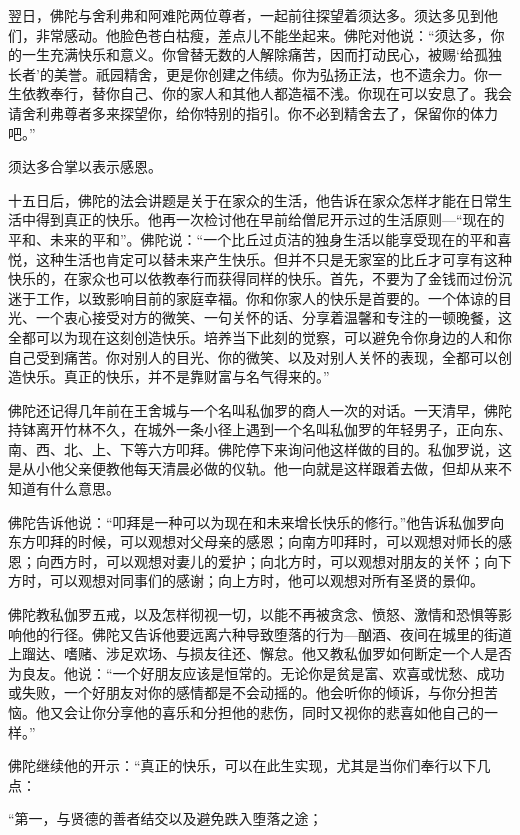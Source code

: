 \documentclass[12pt,twoside,openany]{book}
\begin{document}
翌日，佛陀与舍利弗和阿难陀两位尊者，一起前往探望着须达多。须达多见到他们，非常感动。他脸色苍白枯瘦，差点儿不能坐起来。佛陀对他说：“须达多，你的一生充满快乐和意义。你曾替无数的人解除痛苦，因而打动民心，被赐‘给孤独长者’的美誉。祇园精舍，更是你创建之伟绩。你为弘扬正法，也不遗余力。你一生依教奉行，替你自己、你的家人和其他人都造福不浅。你现在可以安息了。我会请舍利弗尊者多来探望你，给你特别的指引。你不必到精舍去了，保留你的体力吧。”

须达多合掌以表示感恩。

十五日后，佛陀的法会讲题是关于在家众的生活，他告诉在家众怎样才能在日常生活中得到真正的快乐。他再一次检讨他在早前给僧尼开示过的生活原则---“现在的平和、未来的平和”。佛陀说：“一个比丘过贞洁的独身生活以能享受现在的平和喜悦，这种生活也肯定可以替未来产生快乐。但并不只是无家室的比丘才可享有这种快乐的，在家众也可以依教奉行而获得同样的快乐。首先，不要为了金钱而过份沉迷于工作，以致影响目前的家庭幸福。你和你家人的快乐是首要的。一个体谅的目光、一个衷心接受对方的微笑、一句关怀的话、分享着温馨和专注的一顿晚餐，这全都可以为现在这刻创造快乐。培养当下此刻的觉察，可以避免令你身边的人和你自己受到痛苦。你对别人的目光、你的微笑、以及对别人关怀的表现，全都可以创造快乐。真正的快乐，并不是靠财富与名气得来的。”

佛陀还记得几年前在王舍城与一个名叫私伽罗的商人一次的对话。一天清早，佛陀持钵离开竹林不久，在城外一条小径上遇到一个名叫私伽罗的年轻男子，正向东、南、西、北、上、下等六方叩拜。佛陀停下来询问他这样做的目的。私伽罗说，这是从小他父亲便教他每天清晨必做的仪轨。他一向就是这样跟着去做，但却从来不知道有什么意思。

佛陀告诉他说：“叩拜是一种可以为现在和未来增长快乐的修行。”他告诉私伽罗向东方叩拜的时候，可以观想对父母亲的感恩；向南方叩拜时，可以观想对师长的感恩；向西方时，可以观想对妻儿的爱护；向北方时，可以观想对朋友的关怀；向下方时，可以观想对同事们的感谢；向上方时，他可以观想对所有圣贤的景仰。

佛陀教私伽罗五戒，以及怎样彻视一切，以能不再被贪念、愤怒、激情和恐惧等影响他的行径。佛陀又告诉他要远离六种导致堕落的行为---酗酒、夜间在城里的街道上蹓达、嗜赌、涉足欢场、与损友往还、懈怠。他又教私伽罗如何断定一个人是否为良友。他说：“一个好朋友应该是恒常的。无论你是贫是富、欢喜或忧愁、成功或失败，一个好朋友对你的感情都是不会动摇的。他会听你的倾诉，与你分担苦恼。他又会让你分享他的喜乐和分担他的悲伤，同时又视你的悲喜如他自己的一样。”

佛陀继续他的开示：“真正的快乐，可以在此生实现，尤其是当你们奉行以下几点：

“第一，与贤德的善者结交以及避免跌入堕落之途；
\end{document}
